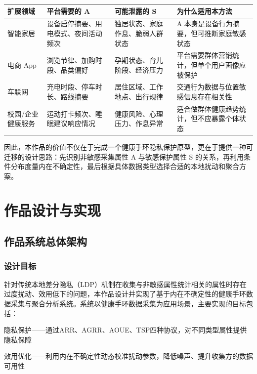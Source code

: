 \documentclass{cumcmthesis}
\numberwithin{equation}{section}
\numberwithin{figure}{section}
\numberwithin{table}{section}
\begin{document}
\begin{table}[htbp]
\centering
\small
\begin{tabularx}{\textwidth}{|>{\raggedright\arraybackslash}X|>{\raggedright\arraybackslash}X|>{\raggedright\arraybackslash}X|>{\raggedright\arraybackslash}X|}
\hline
扩展领域 & 平台需要的 A & 可能泄露的 S & 为什么适用本方法 \\ \hline
智能家居 & 设备启停摘要、用电模式、夜间活动频次 & 独居状态、家庭作息、脆弱人群状态 & A 本身是设备行为摘要，但可推断家庭敏感状态 \\ \hline
电商 App & 浏览节律、加购时段、品类偏好 & 孕期状态、育儿阶段、经济压力 & 平台需要群体营销统计，但单个用户画像应被保护 \\ \hline
车联网 & 充电时段、停车时长、路线摘要 & 居住区域、工作地点、出行规律 & 交通行为数据与位置敏感信息存在相关性 \\ \hline
校园/企业健康服务 & 运动打卡频次、睡眠建议响应情况 & 健康风险、心理压力、作息异常 & 适合做群体健康趋势统计，但不应暴露个体状态 \\ \hline
\end{tabularx}
\end{table}

因此，本作品的价值不仅在于完成一个健康手环隐私保护原型，更在于提供一种可迁移的设计思路：先识别非敏感采集属性 A 与敏感保护属性 S 的关系，再利用条件分布度量内在不确定性，最后根据具体数据类型选择合适的本地扰动和聚合方案。

\clearpage
\section{作品设计与实现}

\subsection{作品系统总体架构}

\subsubsection{设计目标}

针对传统本地差分隐私（LDP）机制在收集与非敏感属性统计相关的属性时存在过度扰动、效用低下的问题，本作品设计并实现了基于内在不确定性的健康手环数据采集与聚合分析系统。系统以健康手环数据采集为应用场景，主要实现的目标包括：

隐私保护——通过ARR、AGRR、AOUE、TSP四种协议，对不同类型属性提供隐私保障

效用优化——利用内在不确定性动态校准扰动参数，降低噪声、提升收集方的数据可用性
\end{document}
